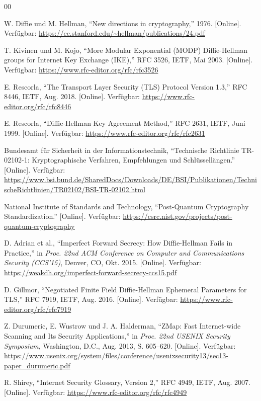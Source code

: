\documentclass[conference]{IEEEtran}
\begin{document}
\begin{thebibliography}{00}

W. Diffie und M. Hellman, ``New directions in cryptography,'' 1976.
[Online]. Verfügbar:
\url{https://ee.stanford.edu/~hellman/publications/24.pdf}

T. Kivinen und M. Kojo, ``More Modular Exponential (MODP)
Diffie-Hellman groups for Internet Key Exchange (IKE),'' RFC 3526,
IETF, Mai 2003. [Online]. Verfügbar:
\url{https://www.rfc-editor.org/rfc/rfc3526}

E. Rescorla, ``The Transport Layer Security (TLS) Protocol Version
1.3,'' RFC 8446, IETF, Aug. 2018. [Online]. Verfügbar:
\url{https://www.rfc-editor.org/rfc/rfc8446}

E. Rescorla, ``Diffie-Hellman Key Agreement Method,'' RFC 2631,
IETF, Juni 1999. [Online]. Verfügbar:
\url{https://www.rfc-editor.org/rfc/rfc2631}

Bundesamt für Sicherheit in der Informationstechnik, ``Technische
Richtlinie TR-02102-1: Kryptographische Verfahren, Empfehlungen und
Schlüssellängen.'' [Online]. Verfügbar:
\url{https://www.bsi.bund.de/SharedDocs/Downloads/DE/BSI/Publikationen/TechnischeRichtlinien/TR02102/BSI-TR-02102.html}

National Institute of Standards and Technology, ``Post-Quantum
Cryptography Standardization.'' [Online]. Verfügbar:
\url{https://csrc.nist.gov/projects/post-quantum-cryptography}

D. Adrian et al., ``Imperfect Forward Secrecy: How Diffie-Hellman
Fails in Practice,'' in \textit{Proc. 22nd ACM Conference on Computer
and Communications Security (CCS'15)}, Denver, CO, Okt. 2015.
[Online]. Verfügbar: \url{https://weakdh.org/imperfect-forward-secrecy-ccs15.pdf}

D. Gillmor, ``Negotiated Finite Field Diffie-Hellman Ephemeral
Parameters for TLS,'' RFC 7919, IETF, Aug. 2016.
[Online]. Verfügbar: \url{https://www.rfc-editor.org/rfc/rfc7919}

Z. Durumeric, E. Wustrow und J. A. Halderman, ``ZMap: Fast
Internet-wide Scanning and Its Security Applications,'' in
\textit{Proc. 22nd USENIX Security Symposium}, Washington, D.C.,
Aug. 2013, S. 605--620.
[Online]. Verfügbar:
\url{https://www.usenix.org/system/files/conference/usenixsecurity13/sec13-paper_durumeric.pdf}

R. Shirey, ``Internet Security Glossary, Version 2,''
RFC 4949, IETF, Aug. 2007.
[Online]. Verfügbar:
\url{https://www.rfc-editor.org/rfc/rfc4949}

\end{thebibliography}
\end{document}

